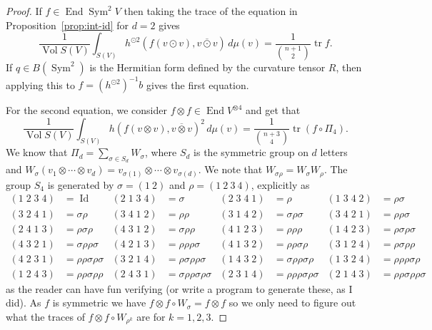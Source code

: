 \documentclass[10pt,a4paper]{amsart}
\theoremstyle{definition}
\def\ov#1{\overline{#1}}
\DeclareMathOperator{\Sym}{Sym}
\DeclareMathOperator{\id}{Id}
\DeclareMathOperator{\tr}{tr}
\DeclareMathOperator{\Vol}{Vol}
\DeclareMathOperator{\End}{End}
\begin{document}
\begin{proof}
If $f \in \End \Sym^2 V$ then taking the trace of the equation in
Proposition~\ref{prop:int-id} for $d = 2$ gives
$$
\frac{1}{\Vol S(V)}
\int_{S(V)} h^{\odot 2}(f(v \odot v), \ov{v \odot v}) \, d\mu(v)
= \frac{1}{\binom{n+1}{2}} \tr f.
$$
If $q \in B(\Sym^2)$ is the Hermitian form defined by the curvature tensor $R$,
then applying this to $f = (h^{\odot 2})^{-1} b$ gives the first equation.

For the second equation,
we consider $f \otimes f \in \End V^{\otimes 4}$ and get that
$$
\frac{1}{\Vol S(V)}
\int_{S(V)} h(f(v \otimes v), \ov{v \otimes v})^2 \, d\mu(v)
= \frac{1}{\binom{n+3}{4}}
\tr (f \circ \Pi_4).
$$
We know that $\Pi_d = \sum_{\sigma \in S_d} W_\sigma$, where $S_d$ is the
symmetric group on $d$ letters and $W_\sigma(v_1 \otimes \cdots \otimes v_d) =
v_{\sigma(1)} \otimes \cdots \otimes v_{\sigma(d)}$.
We note that $W_{\sigma\rho} = W_\sigma W_\rho$.
The group $S_4$ is generated by
$\sigma = (1 \  2)$ and
$\rho = (1 \  2 \  3 \  4)$, explicitly as
\begin{align*}
(1\;2\;3\;4) &= \id
		&
(2\;1\;3\;4) &= \sigma
		&
(2\;3\;4\;1) &= \rho
		&
(1\;3\;4\;2) &= \rho\sigma
\\
(3\;2\;4\;1) &= \sigma\rho
		&
(3\;4\;1\;2) &= \rho \rho
		&
(3\;1\;4\;2) &= \sigma \rho \sigma
		&
(3\;4\;2\;1) &= \rho \rho\sigma
\\
(2\;4\;1\;3) &= \rho \sigma \rho
		&
(4\;3\;1\;2) &= \sigma\rho \rho
		&
(4\;1\;2\;3) &= \rho \rho \rho
		&
(1\;4\;2\;3) &=  \rho\sigma \rho \sigma
\\
(4\;3\;2\;1) &= \sigma \rho \rho \sigma
		&
(4\;2\;1\;3) &= \rho \rho \rho\sigma
		&
(4\;1\;3\;2) &= \rho \rho \sigma \rho
		&
(3\;1\;2\;4) &= \rho \sigma \rho \rho
\\
(4\;2\;3\;1) &= \rho \rho \sigma \rho\sigma
		&
(3\;2\;1\;4) &= \rho \sigma \rho \rho \sigma
		&
(1\;4\;3\;2) &= \sigma \rho \rho \sigma \rho
		&
(1\;3\;2\;4) &= \rho \rho \rho \sigma \rho
\\
(1\;2\;4\;3) &= \rho \rho \sigma \rho \rho
		&
(2\;4\;3\;1) &= \sigma \rho \rho \sigma \rho \sigma
		&
(2\;3\;1\;4) &= \rho \rho \rho \sigma \rho \sigma
		&
(2\;1\;4\;3) &= \rho \rho \sigma \rho \rho \sigma
\end{align*}
as the reader can have fun verifying (or write a program to generate these, as
I did). As $f$ is symmetric we have $f \otimes f \circ W_{\sigma} = f \otimes f$
so we only need to figure out what the traces of $f \otimes f \circ W_{\rho^k}$
are for $k = 1, 2, 3$.


\end{proof}
\end{document}
